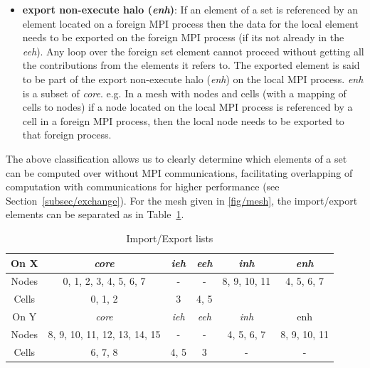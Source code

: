 \documentclass[11pt]{article}
\begin{document}
\begin{itemize}
\item \textbf{export non-execute halo (\textit{enh})}: If an element of a set is
referenced by an element located on a foreign MPI process then the data for the
local element needs to be exported on the foreign MPI process (if its not
already in the \textit{eeh}). Any loop over the foreign set element cannot
proceed without getting all the contributions from the elements it refers to.
The exported element is said to be part of the export non-execute halo
(\textit{enh}) on the local MPI process. \textit{enh} is a subset of
\textit{core}. e.g. In a mesh with nodes and cells (with a mapping of cells to
nodes) if a node located on the local MPI process is referenced by a cell in a
foreign MPI process, then the local node needs to be exported to that foreign
process.
\end{itemize}

\noindent The above classification allows us to clearly determine which elements
of a set can be computed over without MPI communications, facilitating
overlapping of computation with communications for higher performance (see
Section~\ref{subsec/exchange}). For the mesh given in \figurename{
\ref{fig/mesh}}, the import/export elements can be separated as in Table~\ref{tab/impexp}.\\


\begin{table}[ht]
\centering\vspace{-10pt}
\caption{Import/Export lists}\small
\begin{tabular}{|c|c|c|c|c|c|} \hline
On X 	& \textit{core}	& \textit{ieh}	& \textit{eeh} 	& \textit{inh}	&
\textit{enh} 	\\\hline
Nodes	& 0, 1, 2, 3, 4, 5, 6, 7	& -	& -	& 8, 9, 10, 11	& 4, 5,
6, 7	\\\hline
Cells	& 0, 1, 2			& 3	& 4, 5	&	&\\\hline\hline
On Y 	& \textit{core}	& \textit{ieh}	& \textit{eeh}	& \textit{inh} & enh
\\\hline
Nodes	& 8, 9, 10, 11, 12, 13, 14, 15	& -	& -	& 4, 5, 6, 7	& 8, 9,
10, 11 	\\\hline
Cells	& 6, 7, 8	& 4, 5	& 3	& -		& - \\\hline
\end{tabular}\label{tab/impexp}\vspace{-0pt}
\end{table}\normalsize
\end{document}
